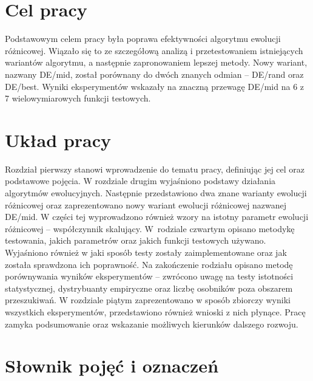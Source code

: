 \documentclass[a4paper,onecolumn,oneside,12pt,wide,floatssmall]{mwrep}
\theoremstyle{definition}
\theoremstyle{plain}%
\theoremstyle{remark}
\begin{document}
\section{Cel pracy}

Podstawowym celem pracy była poprawa efektywności algorytmu ewolucji różnicowej.
Wiązało się to ze szczegółową analizą i przetestowaniem istniejących wariantów algorytmu,
a następnie zapronowaniem lepszej metody. Nowy wariant, nazwany DE/mid, został porównany 
do dwóch znanych odmian -- DE/rand oraz DE/best. 
Wyniki eksperymentów wskazały na znaczną przewagę DE/mid na 6 z 7 wielowymiarowych funkcji testowych.

\section{Układ pracy}

Rozdział pierwszy stanowi wprowadzenie do tematu pracy, definiując jej cel oraz podstawowe pojęcia.
W rozdziale drugim wyjaśniono podstawy działania algorytmów ewolucyjnych. 
Następnie przedstawiono dwa znane warianty ewolucji różnicowej oraz 
zaprezentowano nowy wariant ewolucji różnicowej nazwanej DE/mid. W części tej wyprowadzono również
wzory na istotny parametr ewolucji różnicowej -- współczynnik skalujący. 
W~rodziale czwartym opisano metodykę testowania, jakich parametrów oraz jakich funkcji testowych 
używano.
Wyjaśniono również w jaki sposób testy zostały 
zaimplementowane oraz jak została sprawdzona ich poprawność. Na zakończenie rodziału opisano
metodę porównywania wyników eksperymentów -- zwrócono uwagę na testy istotności 
statystycznej, dystrybuanty empiryczne oraz liczbę osobników poza obszarem przeszukiwań.
W rozdziale piątym zaprezentowano w sposób zbiorczy wyniki wszystkich eksperymentów,
przedstawiono również wnioski z nich płynące. 
Pracę zamyka podsumowanie oraz wskazanie możliwych kierunków dalszego rozwoju.

\section{Słownik pojęć i oznaczeń}
\end{document}
